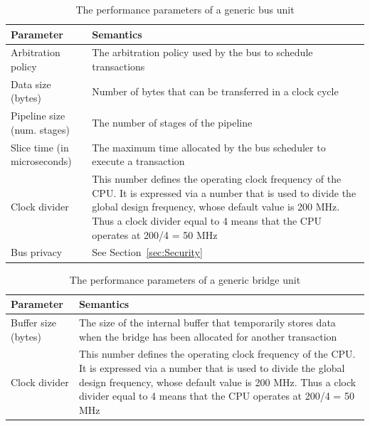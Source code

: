 \documentclass{llncs}
\begin{document}
\begin{table}[!htbp]
\begin{center}
	\caption{The performance parameters of a generic bus unit}
	\label{tab:PerfParamBus}
	\begin{tabular}{| >{\centering\arraybackslash}p{7cm} | >{\centering\arraybackslash}p{7cm} |} \hline
	\textbf{Parameter}				& \textbf{Semantics}	\\ \hline
	Arbitration policy				& The arbitration policy used by the bus to schedule
	transactions\\ \hline
	Data size (bytes)				& Number of bytes that can be transferred in a clock cycle \\ \hline
	Pipeline size (num. stages)			& The number of stages of the pipeline\\ \hline
	Slice time (in microseconds)			& The maximum time allocated by the bus scheduler to execute a
	transaction\\ \hline
	Clock divider					& This number defines the operating clock frequency of the CPU.
	It is expressed via a number that is used to divide the global design frequency, whose default value is 200 MHz.
	Thus a clock divider equal to 4 means that the CPU operates at 200/4 = 50 MHz\\ \hline
	Bus privacy					& See Section~\ref{sec:Security} \\ \hline
	\end{tabular}
\end{center}
\end{table}
%
\begin{table}[!htbp]
\begin{center}
	\caption{The performance parameters of a generic bridge unit}
	\label{tab:PerfParamBridge}
	\begin{tabular}{| >{\centering\arraybackslash}p{7cm} | >{\centering\arraybackslash}p{7cm} |} \hline
	\textbf{Parameter}				& \textbf{Semantics}	\\ \hline
	Buffer size (bytes)				& The size of the internal buffer that temporarily stores data
	when the bridge has been allocated for another transaction\\ \hline
	Clock divider					& This number defines the operating clock frequency of the CPU.
	It is expressed via a number that is used to divide the global design frequency, whose default value is 200 MHz.
	Thus a clock divider equal to 4 means that the CPU operates at 200/4 = 50 MHz\\ \hline
	\end{tabular}
\end{center}
\end{table}
\end{document}
